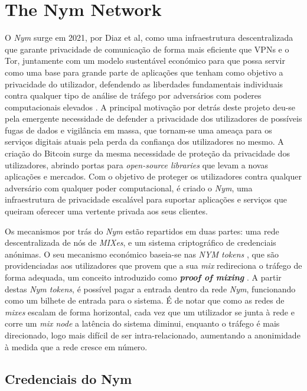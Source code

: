 \section{The Nym Network}
\label{sec:nym}

O \textit{Nym} surge em 2021, por Diaz et al, como uma infraestrutura descentralizada que garante privacidade de comunicação de forma mais eficiente que VPNs e o Tor, juntamente com um modelo sustentável económico para que possa servir como uma base para grande parte de aplicações que tenham como objetivo a privacidade do utilizador, defendendo as liberdades fundamentais individuais contra qualquer tipo de análise de tráfego por adversários com poderes computacionais elevados \cite{diaz2021nym}. A principal motivação por detrás deste projeto deu-se pela emergente necessidade de defender a privacidade dos utilizadores de possíveis fugas de dados e vigilância em massa, que tornam-se uma ameaça para os serviços digitais atuais pela perda da confiança dos utilizadores no mesmo. A criação do Bitcoin \cite{nakamoto2008bitcoin} surge da mesma necessidade de proteção da privacidade dos utilizadores, abrindo portas para \textit{open-source libraries} que levam a novas aplicações e mercados. Com o objetivo de proteger os utilizadores contra qualquer adversário com qualquer poder computacional, é criado o \textit{Nym}, uma infraestrutura de privacidade escalável para suportar aplicações e serviços que queiram oferecer uma vertente privada aos seus clientes.

Os mecanismos por trás do \textit{Nym} estão repartidos em duas partes: uma rede descentralizada de nós de \textit{MIXes}, e um sistema criptográfico de credenciais anónimas. O seu mecanismo económico baseia-se nas \textit{NYM tokens} , que são providenciadas aos utilizadores que provem que a sua \textit{mix} redireciona o tráfego de forma adequada, um conceito introduzido como \textbf{\textit{proof of mixing}} \cite{diaz2021nym}. A partir destas \textit{Nym tokens}, é possível pagar a entrada dentro da rede \textit{Nym}, funcionando como um bilhete de entrada para o sistema. É de notar que como as redes de \textit{mixes} escalam de forma horizontal, cada vez que um utilizador se junta à rede e corre um \textit{mix node} a latência do sistema diminui, enquanto o tráfego é mais direcionado, logo mais difícil de ser intra-relacionado, aumentando a anonimidade à medida que a rede cresce em número.

\subsection{Credenciais do Nym}
\label{sub:nym_credenciais}

